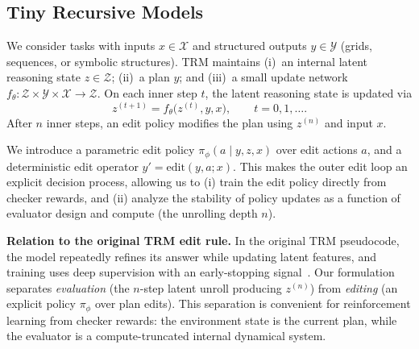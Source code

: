 \documentclass{article}
\theoremstyle{plain}
\theoremstyle{definition}
\theoremstyle{remark}
\newtheorem{remark}[theorem]{Remark}
\newcommand{\longonly}[1]{}
\newcommand{\longonly}[1]{#1}
\newcommand{\XX}{\mathcal{X}}
\newcommand{\YY}{\mathcal{Y}}
\newcommand{\ZZ}{\mathcal{Z}}
\newcommand{\SSS}{\mathcal{S}}
\begin{document}
{\subsection{Tiny Recursive Models}
\label{sec:trm_brief}

We consider tasks with inputs $x\in\XX$ and structured outputs $y\in\YY$ (grids, sequences, or symbolic structures).
TRM maintains
(i)~an internal latent reasoning state $z\in\ZZ$;
(ii)~a plan $y$; and
(iii)~a small update network $f_\theta:\ZZ\times\YY\times\XX\to\ZZ$.
On each inner step $t$, the latent reasoning state is updated via
\begin{equation}
    z^{(t+1)} = f_\theta\bigl(z^{(t)},y,x\bigr),
    \qquad
    t = 0,1,\dots.
    \label{eq:inner}
\end{equation}
After $n$ inner steps, an edit policy modifies the plan using $z^{(n)}$ and input $x$.



We introduce a parametric edit policy $\pi_\phi(a\mid y,z,x)$ over edit actions $a$, and a deterministic edit operator $y' = \mathrm{edit}(y,a;x)$. This makes the outer edit loop an explicit decision process, allowing us to (i) train the edit policy directly from checker rewards, and (ii) analyze the stability of policy updates as a function of evaluator design and compute (the unrolling depth $n$).

\textbf{Relation to the original TRM edit rule.}
In the original TRM pseudocode, the model repeatedly refines its answer while updating latent features, and training uses deep supervision with an early-stopping signal~\citep{TRM2025}.
Our formulation separates \emph{evaluation} (the $n$-step latent unroll producing $z^{(n)}$) from \emph{editing} (an explicit policy $\pi_\phi$ over plan edits).
This separation is convenient for reinforcement learning from checker rewards: the environment state is the current plan, while the evaluator is a compute-truncated internal dynamical system.

\longonly{
\begin{remark}[Mapping to original TRM]
\label{rem:trm_mapping}
In the original TRM implementation~\citep{TRM2025}: (i) the latent $z$ is persistent across edit steps (our persistent-$z$ variant); (ii) deep supervision provides intermediate targets during training; (iii) an ACT-style halting head determines when to stop inner iterations.
Our episodic-$z$ variant simplifies analysis by reinitializing $z$ each step, yielding Markov dynamics on $\SSS_{\mathrm{plan}}$.
Our RL formulation replaces deep supervision with checker-based rewards.
\end{remark}}

}
\end{document}
